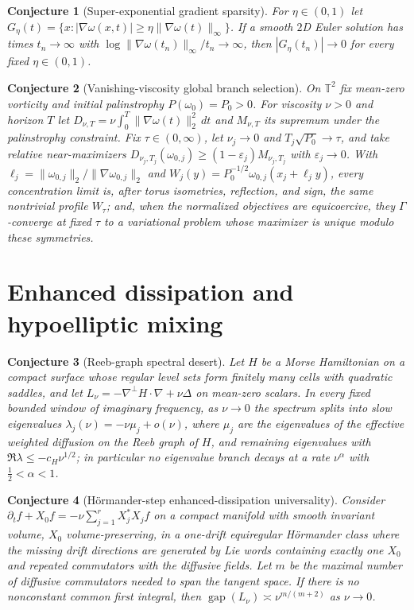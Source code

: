 \documentclass[11pt]{article}
\newtheorem{conjecture}{Conjecture}
\theoremstyle{definition}
\begin{document}
\begin{conjecture}[Super-exponential gradient sparsity]\label{al2}
For $\eta\in(0,1)$ let $G_\eta(t)=\{x:|\nabla\omega(x,t)|\ge\eta\|\nabla\omega(t)\|_\infty\}$.  If a smooth $2$D Euler solution has times $t_n\to\infty$ with $\log\|\nabla\omega(t_n)\|_\infty/t_n\to\infty$, then $|G_\eta(t_n)|\to0$ for every fixed $\eta\in(0,1)$.
\end{conjecture}

\begin{conjecture}[Vanishing-viscosity global branch selection]\label{al3}
On $\mathbb T^2$ fix mean-zero vorticity and initial palinstrophy $P(\omega_0)=P_0>0$.  For viscosity $\nu>0$ and horizon $T$ let $D_{\nu,T}=\nu\int_0^T\|\nabla\omega(t)\|_2^2\,dt$ and $M_{\nu,T}$ its supremum under the palinstrophy constraint.  Fix $\tau\in(0,\infty)$, let $\nu_j\to0$ and $T_j\sqrt{P_0}\to\tau$, and take relative near-maximizers $D_{\nu_j,T_j}(\omega_{0,j})\ge(1-\varepsilon_j)M_{\nu_j,T_j}$ with $\varepsilon_j\to0$.  With $\ell_j=\|\omega_{0,j}\|_2/\|\nabla\omega_{0,j}\|_2$ and $W_j(y)=P_0^{-1/2}\omega_{0,j}(x_j+\ell_jy)$, every concentration limit is, after torus isometries, reflection, and sign, the same nontrivial profile $W_\tau$; and, when the normalized objectives are equicoercive, they $\Gamma$-converge at fixed $\tau$ to a variational problem whose maximizer is unique modulo these symmetries.
\end{conjecture}

\section{Enhanced dissipation and hypoelliptic mixing}

\begin{conjecture}[Reeb-graph spectral desert]\label{al4}
Let $H$ be a Morse Hamiltonian on a compact surface whose regular level sets form finitely many cells with quadratic saddles, and let $L_\nu=-\nabla^\perp H\cdot\nabla+\nu\Delta$ on mean-zero scalars.  In every fixed bounded window of imaginary frequency, as $\nu\to0$ the spectrum splits into slow eigenvalues $\lambda_j(\nu)=-\nu\mu_j+o(\nu)$, where $\mu_j$ are the eigenvalues of the effective weighted diffusion on the Reeb graph of $H$, and remaining eigenvalues with $\Re\lambda\le-c_H\nu^{1/2}$; in particular no eigenvalue branch decays at a rate $\nu^\alpha$ with $\tfrac12<\alpha<1$.
\end{conjecture}

\begin{conjecture}[H\"ormander-step enhanced-dissipation universality]\label{al5}
Consider $\partial_tf+X_0f=-\nu\sum_{j=1}^rX_j^\ast X_jf$ on a compact manifold with smooth invariant volume, $X_0$ volume-preserving, in a one-drift equiregular H\"ormander class where the missing drift directions are generated by Lie words containing exactly one $X_0$ and repeated commutators with the diffusive fields.  Let $m$ be the maximal number of diffusive commutators needed to span the tangent space.  If there is no nonconstant common first integral, then $\operatorname{gap}(L_\nu)\asymp\nu^{m/(m+2)}$ as $\nu\to0$.
\end{conjecture}
\end{document}
